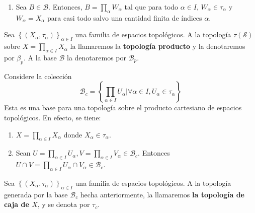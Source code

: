 \documentclass[12pt]{report}
\theoremstyle{largebreak}
\begin{document}
\begin{enumerate}
\begin{equation*}
\begin{array}{lcr}
                X_\alpha & \textup{ si }&\alpha\notin\left\{\alpha_1,...,\alpha_k \right\} \\
            \end{array}
            \right.,\quad\forall\alpha\in I
        \end{equation*}
        Es decir que todo básico es producto cartesiano de una cantidad finita de abiertos y todo lo demás, del espacio correspondiente.
        \item Sea $B\in\mathcal{B}$. Entonces, $B=\prod_{\alpha}W_\alpha$ tal que para todo $\alpha\in I$, $W_\alpha\in\tau_\alpha$ y $W_\alpha=X_\alpha$ para casi todo salvo una cantidad finita de índices $\alpha$.
    \end{enumerate}

    \begin{mydef}
        Sea $\left\{(X_\alpha,\tau_\alpha) \right\}_{ \alpha\in I}$ una familia de espacios topológicos. A la topología $\tau(\mathcal{S})$ sobre $X=\prod_{\alpha\in I}X_\alpha$ la llamaremos la \textbf{topología producto} y la denotaremos por $\beta_p$. A la base $\mathcal{B}$ la denotaremos por $\mathcal{B}_p$.
    \end{mydef}

    Considere la colección
    \begin{equation}
        \mathcal{B}_c=\left\{\prod_{\alpha\in I}U_\alpha\Big|\forall \alpha\in I, U_\alpha\in\tau_\alpha \right\}
    \end{equation}
    Esta es una base para una topología sobre el producto cartesiano de espacios topológicos. En efecto, se tiene:
    \begin{enumerate}
        \item $X=\prod_{\alpha\in I}X_\alpha$ donde $X_\alpha\in\tau_\alpha$.
        \item Sean $U=\prod_{\alpha\in I}U_\alpha,V=\prod_{\alpha\in I}V_\alpha \in\mathcal{B}_c$. Entonces $U\cap V=\prod_{\alpha\in I}U_\alpha\cap V_\alpha\in\mathcal{B}_c$.
    \end{enumerate}

    \begin{mydef}
        Sea $\left\{(X_\alpha,\tau_\alpha) \right\}_{ \alpha\in I}$ una familia de espacios topológicos. A la topología generada por la base $\mathcal{B}_c$ hecha anteriormente, la llamaremos \textbf{la topología de caja de $X$}, y se denota por $\tau_c$.
    \end{mydef}
\end{document}
